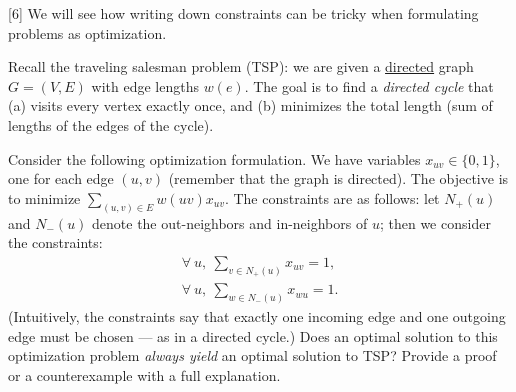 \documentclass[addpoints, 11pt]{exam}
\begin{document}
\begin{questions}

  [6]
  We will see how writing down constraints can be tricky when formulating problems as optimization.

  Recall the traveling salesman problem (TSP): we are given a \underline{directed} graph $G = (V, E)$ with edge lengths $w(e)$.  The goal is to find a {\em directed cycle} that (a) visits every vertex exactly once, and (b) minimizes the total length (sum of lengths of the edges of the cycle).

  Consider the following optimization formulation. We have variables $x_{uv} \in \{0,1\}$, one for each edge $(u,v)$ (remember that the graph is directed). The objective is to minimize $\sum_{(u,v) \in E} w(uv) x_{uv}$. The constraints are as follows: let $N_+(u)$ and $N_-(u)$ denote the out-neighbors and in-neighbors of $u$; then we consider the constraints:
  \begin{align*}
    \forall ~u,~ \sum_{v \in N_+(u)} x_{uv} = 1, \\
    \forall ~u,~ \sum_{w \in N_-(u)} x_{wu} = 1.
  \end{align*}
  (Intuitively, the constraints say that exactly one incoming edge and one outgoing edge must be chosen --- as in a directed cycle.) Does an optimal solution to this optimization problem {\em always yield} an optimal solution to TSP? Provide a proof or a counterexample with a full explanation.


\end{questions}
\end{document}
